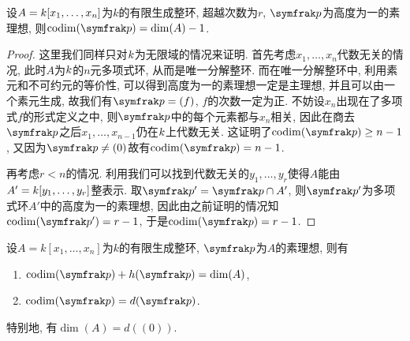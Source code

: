 \begin{proposition}\label{prop:heightoneideallemma}
  设$A=k [x_1, \dotsc, x_n]$为$k$的有限生成整环, 超越次数为$r$, $\ideal{p}$为高度为一的素理想, 则$\codim (\ideal{p}) = \dim (A)-1$.
\end{proposition}

\begin{proof}
  这里我们同样只对$k$为无限域的情况来证明. 首先考虑$x_1, \dotsc, x_n$代数无关的情况, 此时$A$为$k$的$n$元多项式环, 从而是唯一分解整环. 而在唯一分解整环中, 利用素元和不可约元的等价性, 可以得到高度为一的素理想一定是主理想, 并且可以由一个素元生成, 故我们有$\ideal{p}=(f)$, $f$的次数一定为正. 不妨设$x_n$出现在了多项式$f$的形式定义之中, 则$\ideal{p}$中的每个元素都与$x_n$相关, 因此在商去$\ideal{p}$之后$x_1, \dotsc, x_{n-1}$仍在$k$上代数无关. 这证明了$\codim (\ideal{p})\geq n-1$, 又因为$\ideal{p}\neq (0)$故有$\codim (\ideal{p})=n-1$.

  再考虑$r<n$的情况. 利用我们可以找到代数无关的$y_1, \dotsc, y_r$使得$A$能由$A'=k [y_1, \dotsc, y_r]$整表示. 取$\ideal{p}'=\ideal{p}\cap A'$, 则$\ideal{p}'$为多项式环$A'$中的高度为一的素理想, 因此由之前证明的情况知$\codim (\ideal{p}')=r-1$, 于是$\codim (\ideal{p})=r-1$.
\end{proof}

\begin{theorem}\label{thm:ringdim}
  设$A=k[x_1, \dotsc, x_n]$为$k$的有限生成整环, $\ideal{p}$为$A$的素理想, 则有
  \begin{enumerate}
    \item\label{enum:thm-ringdim-height} $\codim(\ideal{p})+h(\ideal{p})=\dim (A)$,
    \item\label{enum:thm-ringdim-depth} $\codim(\ideal{p})=d(\ideal{p})$.
  \end{enumerate}
  特别地, 有$\dim (A) = d((0))$.
\end{theorem}

